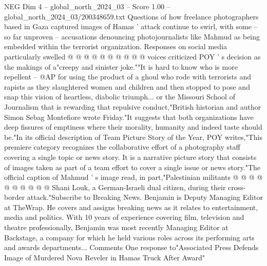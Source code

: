 \begin{textsample}{NEG Dim 4 – global\_north\_2024\_03 – Score 1.00 – global\_north\_2024\_03/200348659.txt}
Questions of how freelance photographers based in Gaza captured images of Hamas ' attack continue to swirl, with some -- so far unproven -- accusations denouncing photojournalists like Mahmud as being embedded within the terrorist organization.
Responses on social media particularly swelled @ @ @ @ @ @ @ @ @ @ voices criticized POY ' s decision as the makings of a"creepy and sinister joke.""It is hard to know who is more repellent -- @AP for using the product of a ghoul who rode with terrorists and rapists as they slaughtered women and children and then stopped to pose and snap this vision of heartless, diabolic triumph... or the Missouri School of Journalism that is rewarding that repulsive conduct,"British historian and author Simon Sebag Montefiore wrote Friday."It suggests that both organizations have deep fissures of emptiness where their morality, humanity and indeed taste should be."In its official description of Team Picture Story of the Year, POY writes,"This premiere category recognizes the collaborative effort of a photography staff covering a single topic or news story.
It is a narrative picture story that consists of images taken as part of a team effort to cover a single issue or news story."The official caption of Mahmud ' s image read, in part,"Palestinian militants @ @ @ @ @ @ @ @ @ @ Shani Louk, a German-Israeli dual citizen, during their cross-border attack."Subscribe to Breaking News.
Benjamin is Deputy Managing Editor at TheWrap.
He covers and assigns breaking news as it relates to entertainment, media and politics.
With 10 years of experience covering film, television and theatre professionally, Benjamin was most recently Managing Editor at Backstage, a company for which he held various roles across its performing arts and awards departments...
Comments One response to"Associated Press Defends Image of Murdered Nova Reveler in Hamas Truck After Award"

\end{textsample}
